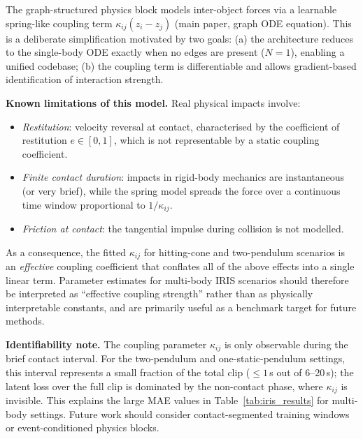 \documentclass[runningheads]{llncs}
\begin{document}
The graph-structured physics block models inter-object forces via a
learnable spring-like coupling term $\kappa_{ij}(z_i - z_j)$
(main paper, graph ODE equation).  This is a deliberate simplification motivated by two goals:
(a) the architecture reduces to the single-body ODE exactly when no edges
are present ($N = 1$), enabling a unified codebase; (b) the coupling term
is differentiable and allows gradient-based identification of interaction
strength.

\textbf{Known limitations of this model.}
Real physical impacts involve:
\begin{itemize}[noitemsep]
  \item \textit{Restitution}: velocity reversal at contact, characterised
    by the coefficient of restitution $e \in [0,1]$, which is not
    representable by a static coupling coefficient.
  \item \textit{Finite contact duration}: impacts in rigid-body mechanics
    are instantaneous (or very brief), while the spring model spreads
    the force over a continuous time window proportional to $1/\kappa_{ij}$.
  \item \textit{Friction at contact}: the tangential impulse during
    collision is not modelled.
\end{itemize}

As a consequence, the fitted $\kappa_{ij}$ for hitting-cone and
two-pendulum scenarios is an \emph{effective} coupling coefficient that
conflates all of the above effects into a single linear term.
Parameter estimates for multi-body IRIS scenarios should therefore
be interpreted as ``effective coupling strength'' rather than as
physically interpretable constants, and are primarily useful as a
benchmark target for future methods.

\textbf{Identifiability note.}  The coupling parameter $\kappa_{ij}$ is
only observable during the brief contact interval.  For the two-pendulum
and one-static-pendulum settings, this interval represents a small fraction
of the total clip ($\leq 1$\,s out of 6--20\,s); the latent loss over the
full clip is dominated by the non-contact phase, where $\kappa_{ij}$ is
invisible.  This explains the large MAE values in Table~\ref{tab:iris_results}
for multi-body settings. Future work should consider contact-segmented
training windows or event-conditioned physics blocks.


\end{document}
